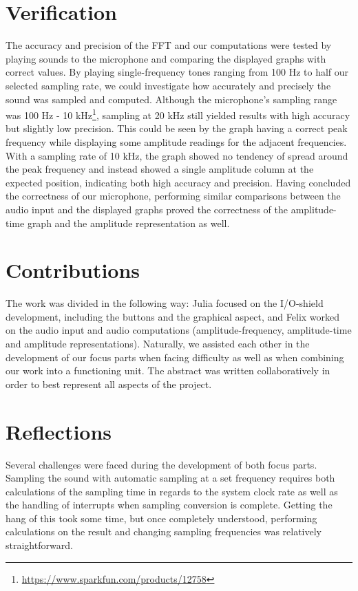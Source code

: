 \documentclass[a4paper,11pt]{article}
\begin{document}
\section*{Verification}
The accuracy and precision of the FFT and our computations were tested by playing sounds to the microphone and comparing the displayed graphs with correct values. By playing single-frequency tones ranging from 100 Hz to half our selected sampling rate, we could investigate how accurately and precisely the sound was sampled and computed. Although the microphone's sampling range was 100 Hz - 10 kHz\footnote{\url{https://www.sparkfun.com/products/12758}}, sampling at 20 kHz still yielded results with high accuracy but slightly low precision. This could be seen by the graph having a correct peak frequency while displaying some amplitude readings for the adjacent frequencies. With a sampling rate of 10 kHz, the graph showed no tendency of spread around the peak frequency and instead showed a single amplitude column at the expected position, indicating both high accuracy and precision. Having concluded the correctness of our microphone, performing similar comparisons between the audio input and the displayed graphs proved the correctness of the amplitude-time graph and the amplitude representation as well.


\section*{Contributions}

The work was divided in the following way: Julia focused on the I/O-shield development, including the buttons and the graphical aspect, and Felix worked on the audio input and audio computations (amplitude-frequency, amplitude-time and amplitude representations). Naturally, we assisted each other in the development of our focus parts when facing difficulty as well as when combining our work into a functioning unit. The abstract was written collaboratively in order to best represent all aspects of the project.

\section*{Reflections}

Several challenges were faced during the development of both focus parts. Sampling the sound with automatic sampling at a set frequency requires both calculations of the sampling time in regards to the system clock rate as well as the handling of interrupts when sampling conversion is complete. Getting the hang of this took some time, but once completely understood, performing calculations on the result and changing sampling frequencies was relatively straightforward.
\end{document}
